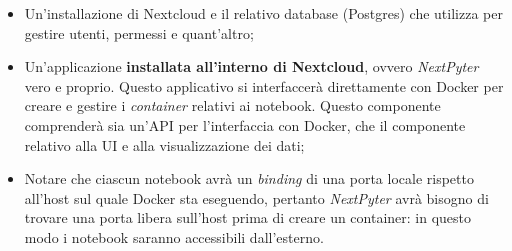 \begin{itemize}
    \item Un'installazione di Nextcloud e il relativo database (Postgres) che utilizza per gestire utenti, permessi e quant'altro;
    \item Un'applicazione \textbf{installata all'interno di Nextcloud}, ovvero \textit{NextPyter} vero e proprio. Questo applicativo si interfaccerà direttamente con Docker per creare e gestire i \textit{container} relativi ai notebook. Questo componente comprenderà sia un'API per l'interfaccia con Docker, che il componente relativo alla UI e alla visualizzazione dei dati;
    \item Notare che ciascun notebook avrà un \textit{binding} di una porta locale rispetto all'host sul quale Docker sta eseguendo, pertanto \textit{NextPyter} avrà bisogno di trovare una porta libera sull'host prima di creare un container: in questo modo i notebook saranno accessibili dall'esterno.
\end{itemize}
\newpage
